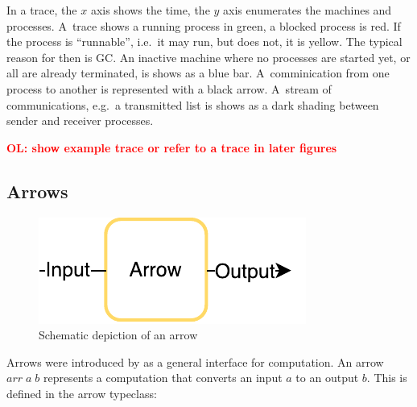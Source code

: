 \documentclass{jfp1}
\newcommand{\Varid}[1]{\mathit{#1}}
\newcommand{\comm}[2]{\textcolor{red}{\bfseries #1: #2}}
\newcommand{\olcomment}[1]{\comm{OL}{#1}}
\DeclareRobustCommand{\hairspn}{\hspace{1pt}\nolinebreak}%
\DeclareRobustCommand{\ie}{{i.\hairspn{}e.~}}
\DeclareRobustCommand{\eg}{{e.\hairspn{}g.~}}
\begin{document}
In a trace, the $x$ axis shows the time, the $y$ axis enumerates the machines and processes. A~trace shows a running process in green, a blocked process is red. If the process is \enquote{runnable}, \ie it may run, but does not, it is yellow. The typical reason for then is GC. An inactive machine where no processes are started yet, or all are already terminated, is shows as a blue bar. A~comminication from one process to another is represented with a black arrow. A~stream of communications, \eg a transmitted list is shows as a dark shading between sender and receiver processes.

\olcomment{show example trace or refer to a trace in later figures}


	\subsection{Arrows}
\label{sec:arrows}
\begin{figure}[h]
	\includegraphics{images/arrow}
	\caption{Schematic depiction of an arrow}
\end{figure}
Arrows were introduced by \citet{HughesArrows} as a general interface for computation. An arrow \ensuremath{\Varid{arr}\;\Varid{a}\;\Varid{b}} represents  a computation that converts an input \ensuremath{\Varid{a}} to an output \ensuremath{\Varid{b}}. This is defined in the arrow typeclass:
\end{document}
